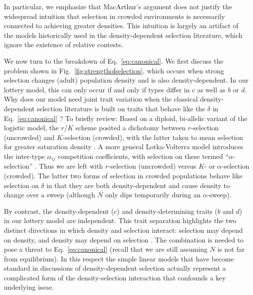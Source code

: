 \documentclass[11pt]{article}
\begin{document}
In particular, we emphasize that MacArthur's argument does not justify the widespread intuition that selection in crowded environments is necessarily connected to achieving greater densities. This intuition is largely an artifact of the models historically used in the density-dependent selection literature, which ignore the existence of relative contests. 


We now turn to the breakdown of Eq.~\eqref{eq:canonical}. We first discuss the problem shown in Fig.~\ref{fig:strengthofselection}, which occurs when strong selection changes (adult) population density and is also density-dependent. In our lottery model, this can only occur if and only if types differ in $c$ as well as $b$ or $d$. Why does our model need joint trait variation when the classical density-dependent selection literature is built on traits that behave like the $\delta$ in Eq.~\eqref{eq:canonical} \citep{christiansen_2004}? To briefly review: Based on a diploid, bi-allelic variant of the logistic model, the $r$/$K$ scheme posited a dichotomy between $r$-selection (uncrowded) and $K$-selection (crowded), with the latter taken to mean selection for greater saturation density \citep{gill_1974}. A more general Lotka-Volterra model introduces the inter-type $\alpha_{ij}$ competition coefficients, with selection on these termed ``$\alpha$-selection'' \citep{gill_1974,joshi_2001}. Thus we are left with $r$-selection (uncrowded) versus $K$- or $\alpha$-selection (crowded). The latter two forms of selection in crowded populations behave like selection on $\delta$ in that they are both density-dependent and cause density to change over a sweep (although $N$ only dips temporarily during an $\alpha$-sweep). 

By contrast, the density-dependent ($c$) and density-determining traits ($b$ and $d$) in our lottery model are independent. This trait separation highlights the two distinct directions in which density and selection interact: selection may depend on density, and density may depend on selection \citep{prout_1980}. The combination is needed to pose a threat to Eq.~\eqref{eq:canonical} (recall that we are still assuming $N$ is not far from equilibrium). In this respect the simple linear models that have become standard in discussions of density-dependent selection \citep{roughgarden_1979,christiansen_2004,mallet_2012} actually represent a complicated form of the density-selection interaction that confounds a key underlying issue. 
\end{document}
